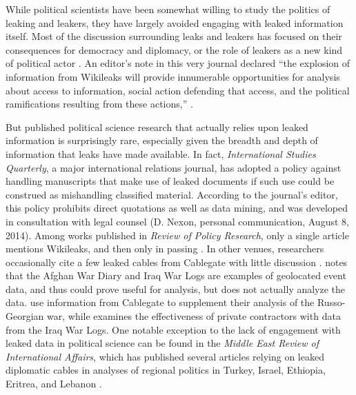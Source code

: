 \documentclass[12pt]{article}
\begin{document}
While political scientists have been somewhat willing to study the politics of leaking and leakers, 
they have largely avoided engaging with leaked information itself.
Most of the discussion surrounding leaks and leakers has focused on 
their consequences for democracy and diplomacy, or the role of 
leakers as a new kind of political actor \citep{simmons2011international,
davis2012political,pieterse2012leaking,springer2012leaky,
wong2013e-bandits}. An editor's note in this very journal declared ``the explosion of information 
from Wikileaks will provide innumerable opportunities for analysis about access to information, social action 
defending that access, and the political ramifications resulting from these actions,'' \citep[123]{gore2011editors}.

But published political science research that actually relies upon leaked information is surprisingly rare, especially given the breadth and depth of information that leaks have made 
available. 
In fact, \emph{International Studies Quarterly}, a major international relations journal, 
has adopted a policy against handling manuscripts that make use of leaked documents if such use 
could be construed as mishandling classified material. According to the journal's editor, 
this policy prohibits direct quotations as well as data mining, and was developed in consultation with legal 
counsel (D. Nexon, personal communication, August 8, 2014).
Among works published in \textit{Review of Policy Research}, only a single article mentions Wikileaks, and then only in passing \citep{kingiri2012role}.
In other venues, researchers occasionally cite a few leaked cables from 
Cablegate with little discussion \citep{bowen2011irans,guliyev2012political}.
\citet{schrodt2012precedents} notes that the Afghan War Diary and Iraq War Logs are examples of 
geolocated event data, and thus could prove useful for analysis, but does not actually analyze the 
data.
\citet{mouritzen2012explaining} use information from Cablegate to supplement their analysis of the 
Russo-Georgian war, while
\citet{petersohn2013effectiveness} examines the effectiveness of private contractors with data from the 
Iraq War Logs. 
One notable exception to the lack of engagement with leaked data in political science 
can be found in the \emph{Middle East Review of International Affairs}, which has published several 
articles relying on leaked diplomatic cables in analyses of regional politics in Turkey, Israel, 
Ethiopia, Eritrea, and Lebanon \citep{altiparmak2011wikileaks,
spyer2011israel,lefebvre2012choosing,smyth2011``independent}.
\end{document}
